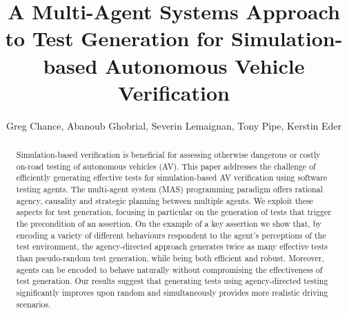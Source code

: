 \documentclass[runningheads,a4paper]{llncs}
\begin{document}

\mainmatter


\title{A Multi-Agent Systems Approach to Test Generation for Simulation-based Autonomous Vehicle Verification}




\author{Greg Chance, Abanoub Ghobrial, Severin Lemaignan, Tony Pipe, Kerstin Eder}

\maketitle

\makeatletter
\renewcommand\subsubsection{\@startsection{subsubsection}{3}{\z@}%
                       {-18\p@ \@plus -4\p@ \@minus -4\p@}%
                       {4\p@ \@plus 2\p@ \@minus 2\p@}%
                       {\normalfont\normalsize\bfseries\boldmath
                        \rightskip=\z@ \@plus 8em\pretolerance=10000 }}
\makeatother


\begin{abstract}
Simulation-based verification is beneficial for assessing otherwise dangerous or costly on-road testing of autonomous vehicles (AV). This paper addresses the challenge of efficiently generating effective tests for simulation-based AV verification using software testing agents. The multi-agent system (MAS) programming paradigm offers rational agency, causality and strategic planning between multiple agents. We exploit these aspects for test generation, focusing in particular on the generation of tests that trigger the precondition of an assertion. On the example of a key assertion we show that, by encoding a variety of different behaviours respondent to the agent's perceptions of the test environment, the agency-directed approach generates twice as many effective tests than pseudo-random test generation, while being both efficient and robust. Moreover, agents can be encoded to behave naturally without compromising the effectiveness of test generation. Our results suggest that generating tests using agency-directed testing significantly improves upon random and simultaneously provides more realistic driving scenarios.
\end{abstract}
\end{document}

